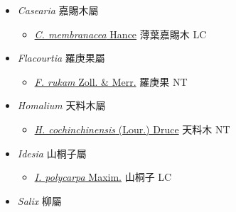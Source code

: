 
  \begin{itemize}
 \item[] \textit{Casearia} 嘉賜木屬
                                
  \begin{itemize}
        \item[] \href{http://www.theplantlist.org/tpl1.1/search?q=Casearia+membranacea}{\textit{C. membranacea} Hance}   薄葉嘉賜木   LC
  \end{itemize}
 \item[] \textit{Flacourtia} 羅庚果屬
                                
  \begin{itemize}
        \item[] \href{http://www.theplantlist.org/tpl1.1/search?q=Flacourtia+rukam}{\textit{F. rukam} Zoll. \& Merr.}   羅庚果   NT
  \end{itemize}
 \item[] \textit{Homalium} 天料木屬
                                
  \begin{itemize}
        \item[] \href{http://www.theplantlist.org/tpl1.1/search?q=Homalium+cochinchinensis}{\textit{H. cochinchinensis} (Lour.) Druce}   天料木   NT
  \end{itemize}
 \item[] \textit{Idesia} 山桐子屬
                                
  \begin{itemize}
        \item[] \href{http://www.theplantlist.org/tpl1.1/search?q=Idesia+polycarpa}{\textit{I. polycarpa} Maxim.}   山桐子   LC
  \end{itemize}
 \item[] \textit{Salix} 柳屬
                                

\end{itemize}

